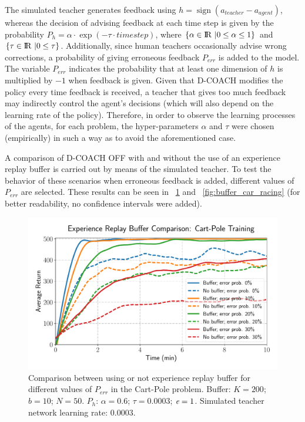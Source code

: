 The simulated teacher generates feedback using $h = \operatorname{sign}(a_{\mathit{teacher}} - a_{\mathit{agent}})$, whereas the decision of advising feedback at each time step is given by the probability $P_{h} = \alpha \cdot\exp(-\tau\cdot \mathit{timestep})$, where $\{\alpha \in {\rm I\!R}\ | 0 \le \alpha \le 1\}$ and $\{\tau \in {\rm I\!R}\ | 0 \le \tau\}$. Additionally, since human teachers occasionally advise wrong corrections, a probability of giving erroneous feedback $P_{\mathit{err}}$ is added to the model. The variable $P_{\mathit{err}}$ indicates the probability that at least one dimension of $h$ is multiplied by $-1$ when feedback is given. Given that D-COACH modifies the policy every time feedback is received, a teacher that gives too much feedback may indirectly control the agent's decisions (which will also depend on the learning rate of the policy). Therefore, in order to observe the learning processes of the agents, for each problem, the hyper-parameters $\alpha$ and $\tau$ were chosen (empirically) in such a way as to avoid the aforementioned case.

A comparison of D-COACH OFF with and without the use of an experience replay buffer is carried out by means of the simulated teacher. To test the behavior of these scenarios when erroneous feedback is added, different values of $P_{\mathit{err}}$ are selected. These results can be seen in \figurename~{\ref{fig:buffer_cart_pole}} and \figurename~{\ref{fig:buffer_car_racing}} (for better readability, no confidence intervals were added).

\begin{figure}[H]
    \centering
    \vspace{-0.2cm}
    \includegraphics[width=0.66\linewidth]{imagenes/cap3/buffer_cart_pole.pdf}
    \vspace{-0.2cm}
    \caption[Comparison between using or not experience replay buffer for different values of $P_\mathit{err}$ in the Cart-Pole problem.]{Comparison between using or not experience replay buffer for different values of $P_\mathit{err}$ in the Cart-Pole problem. Buffer: $K = 200$; $b = 10$; $N = 50$. $P_{h}$: $\alpha = 0.6$; $\tau = 0.0003$; $\emph{e}=1$. Simulated teacher network learning rate: $0.0003$.}
    \label{fig:buffer_cart_pole}
    \vspace{-0.2cm}
\end{figure}

